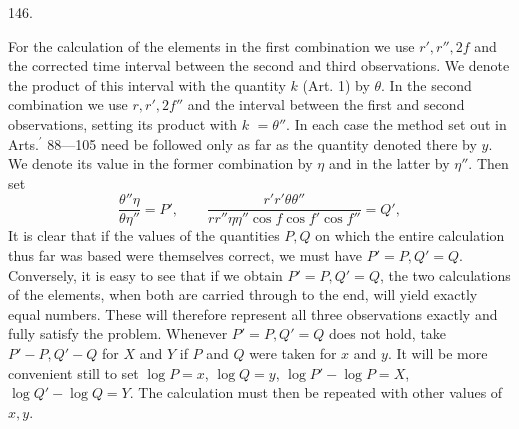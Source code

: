 \par{}\medskip
\begin{center}\hypertarget{native-196-article146}{}146.\end{center}
For the calculation of the elements in the first combination we use $r',r'',2f$ and the corrected time interval between the second and third observations. We denote the product of this interval with the quantity $k$ (Art. 1) by $\theta$. In the second combination we use $r,r',2f''$ and the interval between the first and second observations, setting its product with $k$ $=\theta''$. In each case the method set out in Arts.$^{\prime}$ 88—105 need be followed only as far as the quantity denoted there by $y$. We denote its value in the former combination by $\eta$ and in the latter by $\eta''$. Then set
\[
\frac{\theta''\eta}{\theta\eta''}=P',\qquad
\frac{r'r'\theta\theta''}{rr''\eta\eta''\cos f\cos f'\cos f''}=Q',
\]
It is clear that if the values of the quantities $P,Q$ on which the entire calculation thus far was based were themselves correct, we must have \mbox{$P'=P,Q'=Q$}. Conversely, it is easy to see that if we obtain $P'=P,Q'=Q$, the two calculations of the elements, when both are carried through to the end, will yield exactly equal numbers. These will therefore represent all three observations exactly and fully satisfy the problem. Whenever $P'=P,Q'=Q$ does not hold, take $P'-P,Q'-Q$ for $X$ and $Y$ if $P$ and $Q$ were taken for $x$ and $y$. It will be more convenient still to set $\log P=x$, $\log Q=y$, $\log P'-\log P=X$, $\log Q'-\log Q=Y$.
The calculation must then be repeated with other values of $x,y$.

